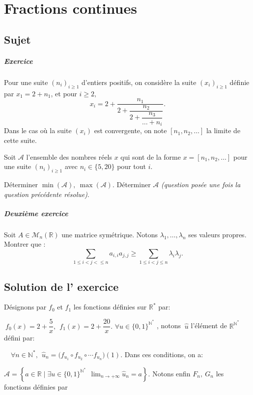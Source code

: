 \chapter{Fractions continues}
\section{Sujet}

\paragraph{Exercice}
Pour une suite $(n_i)_{i\geqslant1}$ d'entiers positifs, on considère la suite $(x_i)_{i\geqslant 1}$ définie par $x_1 =2 + n_1$, et pour $i\geqslant 2,$
$$x_i = 2 +\dfrac {n_1}{2+ \dfrac{n_2}{2+\dfrac {n_3}{\dots + n_i}}}.$$ 
Dans le cas où la suite $(x_i)$ est convergente, on note $[n_1,n_2, \dots ] $ la limite de cette suite.

Soit $\mathcal A$ l'ensemble des nombres réels $x$ qui sont de la forme $x = [n_1,n_2, \dots]$ pour une suite $(n_i)_{i\geqslant 1}$ avec $n_i \in \{5,20\}$ pour tout $i$.

Déterminer $\min (\mathcal A), \: \max (\mathcal A).$ Déterminer $\mathcal A$ \textit{(question posée une fois la question précédente résolue)}.

\paragraph{Deuxième exercice}
Soit $A \in \mathscr M_n(\mathbb R)$ une matrice symétrique. Notons $\lambda_1,\dots,\lambda_n$ ses valeurs propres. Montrer que :
\[
\sum_{1 \leqslant i < j < \leqslant n} a_{i,i} a_{j,j} \geqslant \sum_{1 \leqslant i < j \leqslant n} \lambda_i \lambda_j.
\]


\section{Solution de l' exercice} %
 Désignons par $f_0$ et $f_1$ les fonctions définies sur $\mathbb R^*$ par: 
 
 $\: f_0(x) = 2 +\dfrac 5 x, \:\: f_1(x) = 2+ \dfrac {20}x.$ 
 $\forall u \in \{0,1\}^{\mathbb N^*} $ , notons  $\:\widehat u$   l'élément de $\mathbb R^{\mathbb N^*}$ défini par:
 
 $\quad \forall n \in \mathbb N^*, \:\: \widehat u_n =\Big(f_{u_1} \circ f_{u_2}\circ \cdots f_{u_n}\Big ) (1).$ 
 Dans ces conditions, on a:  
 
 $ \mathcal A= \left\{a \in \mathbb R \mid \exists u \in \{ 0,1\}^{\mathbb N^* }\:\: \displaystyle \lim_{n \to + \infty} \widehat u_n = a \right \}.$ 
Notons enfin $F_n,\:G_n$ les fonctions définies par 

